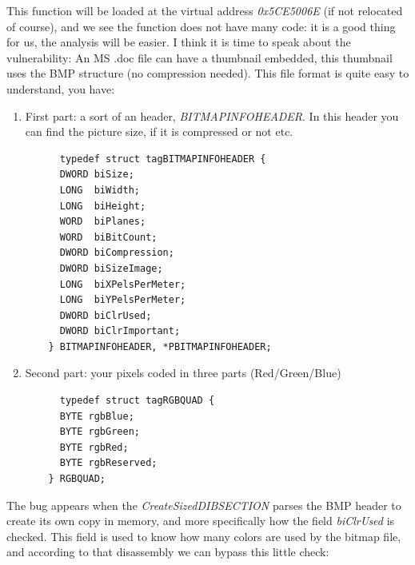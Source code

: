 \documentclass[12pt, titlepage]{article}
\begin{document}
This function will be loaded at the virtual address \emph{0x5CE5006E} (if not relocated of course), and we see the function does not have many code: it is a good thing for us, the analysis will be easier.
I think it is time to speak about the vulnerability: An MS .doc file can have a thumbnail embedded, this thumbnail uses the BMP structure (no compression needed). This file format is quite easy to understand, you have:
\begin{enumerate}
  \item First part: a sort of an header, \emph{BITMAPINFOHEADER}. In this header you can find the picture size, if it is compressed or not etc.
  \lstset{language=C,caption=BITMAPINFOHEADER structure}
    \begin{lstlisting}
      typedef struct tagBITMAPINFOHEADER {
      DWORD biSize;
      LONG  biWidth;
      LONG  biHeight;
      WORD  biPlanes;
      WORD  biBitCount;
      DWORD biCompression;
      DWORD biSizeImage;
      LONG  biXPelsPerMeter;
      LONG  biYPelsPerMeter;
      DWORD biClrUsed;
      DWORD biClrImportant;
    } BITMAPINFOHEADER, *PBITMAPINFOHEADER;
  \end{lstlisting}
  \item Second part: your pixels coded in three parts (Red/Green/Blue)

  \lstset{language=C,caption=RGBQUAD structure}
    \begin{lstlisting}
      typedef struct tagRGBQUAD {
      BYTE rgbBlue;
      BYTE rgbGreen;
      BYTE rgbRed;
      BYTE rgbReserved;
    } RGBQUAD;
  \end{lstlisting}
\end{enumerate}

The bug appears when the \emph{CreateSizedDIBSECTION} parses the BMP header to create its own copy in memory, and more specifically how the field \emph{biClrUsed} is checked. This field is used to know how many colors are used by the bitmap file, and according to that disassembly we can bypass this little check:
\end{document}
